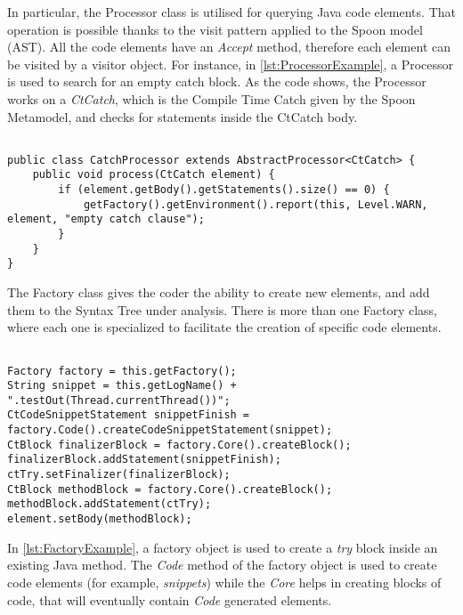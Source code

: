 In particular, the Processor class is utilised for querying Java code elements. That operation is possible thanks to the visit pattern applied to the Spoon model (AST). All the code elements have an \emph{Accept} method, therefore each element can be visited by a visitor object. For instance, in \autoref{lst:ProcessorExample}, a Processor is used to search for an empty catch block. As the code shows, the Processor works on a \textit{CtCatch}, which is the Compile Time Catch given by the Spoon Metamodel, and checks for statements inside the CtCatch body.

\begin{lstlisting}[caption={Processor example taken from \href{http://spoon.gforge.inria.fr/processor.html}{Spoon documentation}},label={lst:ProcessorExample}]% Start your code-block

public class CatchProcessor extends AbstractProcessor<CtCatch> {
	public void process(CtCatch element) {
		if (element.getBody().getStatements().size() == 0) {
			getFactory().getEnvironment().report(this, Level.WARN, element, "empty catch clause");
		}
	}
}
\end{lstlisting}

The Factory class gives the coder the ability to create new elements, and add them to the Syntax Tree under analysis. There is more than one Factory class, where each one is specialized to facilitate the creation of specific code elements.

\begin{lstlisting}[caption={Factory example taken from \href{https://www.programcreek.com/java-api-examples/index.php?api=spoon.reflect.factory.Factory}{Spoon Projects}},label={lst:FactoryExample}]% Start your code-block

Factory factory = this.getFactory();
String snippet = this.getLogName() + ".testOut(Thread.currentThread())";
CtCodeSnippetStatement snippetFinish = factory.Code().createCodeSnippetStatement(snippet);
CtBlock finalizerBlock = factory.Core().createBlock();
finalizerBlock.addStatement(snippetFinish);
ctTry.setFinalizer(finalizerBlock);
CtBlock methodBlock = factory.Core().createBlock();
methodBlock.addStatement(ctTry);
element.setBody(methodBlock);
\end{lstlisting}

In \autoref{lst:FactoryExample}, a factory object is used to create a \textit{try} block inside an existing Java method. The \emph{Code} method of the factory object is used to create code elements (for example, \textit{snippets}) while the \emph{Core} helps in creating blocks of code, that will eventually contain \emph{Code} generated elements.